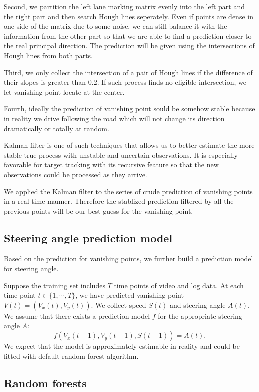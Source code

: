 \documentclass[11pt, oneside]{article}
\begin{document}
Second, we partition the left lane marking matrix evenly into the left part and the right part and then search Hough lines seperately. Even if points are dense in one side of the matrix due to some noise, we can still balance it with the information from the other part so that we are able to find a prediction closer to the real principal direction. The prediction will be given using the intersections of Hough lines from both parts. 

Third, we only collect the intersection of a pair of Hough lines if the difference of their slopes is greater than $0.2$. If such process finds no eligible intersection, we let vanishing point locate at the center. 

Fourth, ideally the prediction of vanishing point sould be somehow stable because in reality we drive following the road which will not change its direction dramatically or totally at random. 

Kalman filter is one of such techniques that allows us to better estimate the more stable true process with unstable and uncertain observations. It is especially favorable for target tracking with its recursive feature so that the new observations could be processed as they arrive. 

We applied the Kalman filter to the series of crude prediction of vanishing points in a real time manner. Therefore the stablized prediction filtered by all the previous points will be our best guess for the vanishing point. 



\subsection*{Steering angle prediction model}

Based on the prediction for vanishing points, we further build a prediction model for steering angle. 

Suppose the training set includes $T$ time points of video and log data. At each time point $t \in \{1, \cdots, T\}$, we have predicted vanishing point $V(t) = (V_x(t), V_y(t))$. We collect speed $S(t)$ and steering angle $A(t)$. We assume that there exists a prediction model $f$ for the appropriate steering angle $A$:
$$
f(V_x(t-1), V_y(t-1), S(t-1)) = A(t).
$$
We expect that the model is approximately estimable in reality and could be fitted with default random forest algorithm. 

\subsection*{Random forests}
\end{document}
